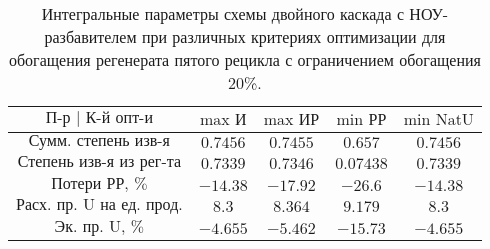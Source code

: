 \begin{table}
    \begin{tabular}{ccccc}
        $\text{П-р | К-й опт-и}$ & $\text{max И}$ & $\text{max ИР}$ & $\text{min РР}$ & $\text{min NatU}$\\ \hline
        $\text{Сумм. степень изв-я}$ & $0.7456$ & $0.7455$ & $0.657$ & $0.7456$\\ \hline
        $\text{Степень изв-я из рег-та}$ & $0.7339$ & $0.7346$ & $0.07438$ & $0.7339$\\ \hline
        $\text{Потери РР, \%}$ & $-14.38$ & $-17.92$ & $-26.6$ & $-14.38$\\ \hline
        $\text{Расх. пр. U на ед. прод.}$ & $8.3$ & $8.364$ & $9.179$ & $8.3$\\ \hline
        $\text{Эк. пр. U, \%}$ & $-4.655$ & $-5.462$ & $-15.73$ & $-4.655$
    \end{tabular}
    \caption{Интегральные параметры схемы двойного каскада с НОУ-разбавителем при различных критериях оптимизации для обогащения регенерата пятого рецикла с ограничением обогащения 20\%.{\label{2opt5_20_int}}}
\end{table}

